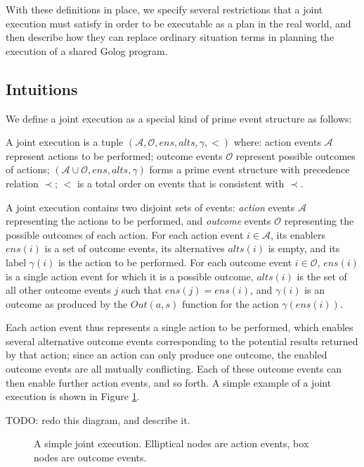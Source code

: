 With these definitions in place, we specify several restrictions that
a joint execution must satisfy in order to be executable as a plan
in the real world, and then describe how they can replace ordinary
situation terms in planning the execution of a shared Golog program.


\subsection{Intuitions}

We define a joint execution as a special kind of prime event structure
as follows:

\begin{defnL}
 A joint execution is a tuple $(\mathcal{A},\mathcal{O},ens,alts,\gamma,<)$
where: action events $\mathcal{A}$ represent actions to be performed;
outcome events $\mathcal{O}$ represent possible outcomes of actions;
$(\mathcal{A}\cup\mathcal{O},ens,alts,\gamma)$ forms a prime event
structure with precedence relation $\prec$; $<$ is a total order
on events that is consistent with $\prec$. 
\end{defnL}
A joint execution contains two disjoint sets of events: \emph{action}
events $\mathcal{A}$ representing the actions to be performed, and
\emph{outcome} events $\mathcal{O}$ representing the possible outcomes
of each action. For each action event $i\in\mathcal{A}$, its enablers
$ens(i)$ is a set of outcome events, its alternatives $alts(i)$
is empty, and its label $\gamma(i)$ is the action to be performed.
For each outcome event $i\in\mathcal{O}$, $ens(i)$ is a single action
event for which it is a possible outcome, $alts(i)$ is the set of
all other outcome events $j$ such that $ens(j)=ens(i)$, and $\gamma(i)$
is an outcome as produced by the $Out(a,s)$ function for the action
$\gamma(ens(i))$.

Each action event thus represents a single action to be performed,
which enables several alternative outcome events corresponding to
the potential results returned by that action; since an action can
only produce one outcome, the enabled outcome events are all mutually
conflicting. Each of these outcome events can then enable further
action events, and so forth. A simple example of a joint execution
is shown in Figure \ref{fig:example-je}.

TODO: redo this diagram, and describe it.

%
\begin{figure}[t]

\caption{ A simple joint execution. Elliptical nodes are action events, box
nodes are outcome events. }


\label{fig:example-je} 
\end{figure}



